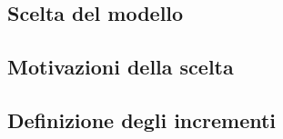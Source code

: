\subsection{Scelta del modello}\label{sec:Scelta-modello}


\subsection{Motivazioni della scelta}\label{sec:Motivazioni}


\subsection{Definizione degli incrementi}\label{sec:Incrementi}

    
